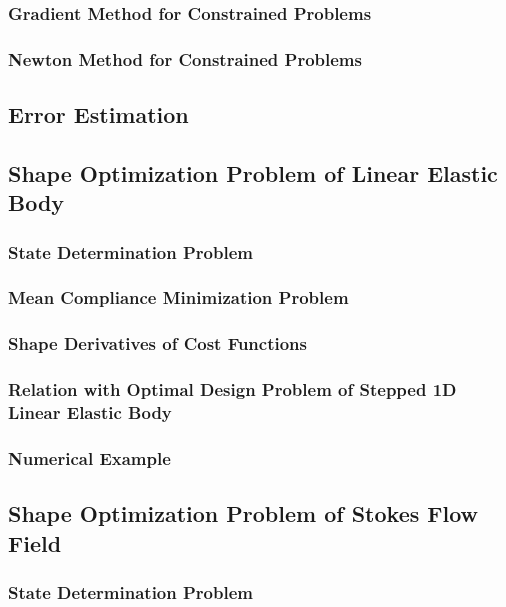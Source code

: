 \documentclass[oneside]{book}
\numberwithin{equation}{section}
\begin{document}
\subsubsection{Gradient Method for Constrained Problems}

\subsubsection{Newton Method for Constrained Problems}

\subsection{Error Estimation}

\subsection{Shape Optimization Problem of Linear Elastic Body}

\subsubsection{State Determination Problem}

\subsubsection{Mean Compliance Minimization Problem}

\subsubsection{Shape Derivatives of Cost Functions}

\subsubsection{Relation with Optimal Design Problem of Stepped 1D Linear Elastic Body}

\subsubsection{Numerical Example}

\subsection{Shape Optimization Problem of Stokes Flow Field}

\subsubsection{State Determination Problem}
\end{document}
